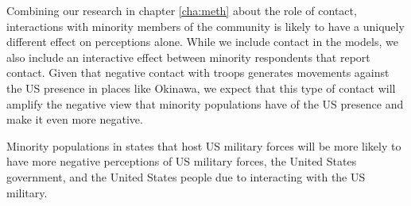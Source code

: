 
Combining our research in chapter \ref{cha:meth} about the role of contact, interactions with minority members of the community is likely to have a uniquely different effect on perceptions alone. While we include contact in the models, we also include an interactive effect between minority respondents that report contact. Given that negative contact with troops generates movements against the US presence in places like Okinawa, we expect that this type of contact will amplify the negative view that minority populations have of the US presence and make it even more negative.

\begin{hyp}
	Minority populations in states that host US military forces will be more likely to have more negative perceptions of US military forces, the United States government, and the United States people due to interacting with the US military. 
\end{hyp}




